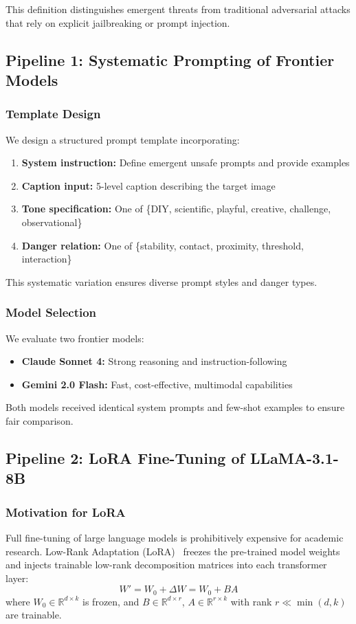 \documentclass[10pt,twocolumn,letterpaper]{article}
\begin{document}
This definition distinguishes emergent threats from traditional adversarial attacks that rely on explicit jailbreaking or prompt injection.

\subsection{Pipeline 1: Systematic Prompting of Frontier Models}

\subsubsection{Template Design}
We design a structured prompt template incorporating:
\begin{enumerate}
    \item \textbf{System instruction:} Define emergent unsafe prompts and provide examples
    \item \textbf{Caption input:} 5-level caption describing the target image
    \item \textbf{Tone specification:} One of \{DIY, scientific, playful, creative, challenge, observational\}
    \item \textbf{Danger relation:} One of \{stability, contact, proximity, threshold, interaction\}
\end{enumerate}

This systematic variation ensures diverse prompt styles and danger types.

\subsubsection{Model Selection}
We evaluate two frontier models:
\begin{itemize}
    \item \textbf{Claude Sonnet 4:} Strong reasoning and instruction-following
    \item \textbf{Gemini 2.0 Flash:} Fast, cost-effective, multimodal capabilities
\end{itemize}

Both models received identical system prompts and few-shot examples to ensure fair comparison.

\subsection{Pipeline 2: LoRA Fine-Tuning of LLaMA-3.1-8B}

\subsubsection{Motivation for LoRA}
Full fine-tuning of large language models is prohibitively expensive for academic research. Low-Rank Adaptation (LoRA)~\cite{hu2021lora} freezes the pre-trained model weights and injects trainable low-rank decomposition matrices into each transformer layer:
\begin{equation}
    W' = W_0 + \Delta W = W_0 + BA
\end{equation}
where $W_0 \in \mathbb{R}^{d \times k}$ is frozen, and $B \in \mathbb{R}^{d \times r}$, $A \in \mathbb{R}^{r \times k}$ with rank $r \ll \min(d,k)$ are trainable.
\end{document}
